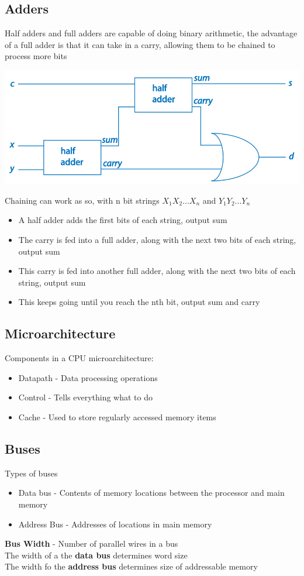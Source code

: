 \documentclass{article}[18pt]
\begin{document}
\subsection{Adders}
Half adders and full adders are capable of doing binary arithmetic, the advantage of a full adder is that it can take in a carry, allowing them to be chained to process more bits
\begin{center}
	\includegraphics[scale=0.5]{"full_adder"}
\end{center}
Chaining can work as so, with n bit strings $X_1X_2...X_n$ and $Y_1Y_2...Y_n$
\begin{itemize}
	\item A half adder adds the first bits of each string, output sum
	\item The carry is fed into a full adder, along with the next two bits of each string, output sum
	\item This carry is fed into another full adder, along with the next two bits of each string, output sum
	\item This keeps going until you reach the nth bit, output sum and carry
\end{itemize}
\subsection{Microarchitecture}
Components in a CPU microarchitecture:
\begin{itemize}
	\item Datapath - Data processing operations
	\item Control - Tells everything what to do
	\item Cache - Used to store regularly accessed memory items
\end{itemize}
\subsection{Buses}
Types of buses
\begin{itemize}
	\item Data bus - Contents of memory locations between the processor and main memory
	\item Address Bus - Addresses of locations in main memory
\end{itemize}
\textbf{Bus Width} - Number of parallel wires in a bus\\
The width of a the \textbf{data bus} determines word size\\
The width fo the \textbf{address bus} determines size of addressable memory
\end{document}
